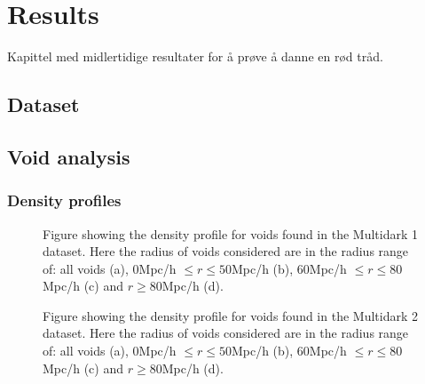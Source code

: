 \chapter{Results}
Kapittel med midlertidige resultater for å prøve å danne en rød tråd.
\section{Dataset}
\section{Void analysis}
\subsection{Density profiles}
\begin{figure}[htbp]\label{fig:histMD1}
    \hspace{1em}%
    \hspace{1em}%
    \caption{Figure showing the density profile for voids found in the Multidark 1 dataset. Here the radius of voids considered are in the radius range of: all voids (a), $0$Mpc/h $\leq r\leq 50$Mpc/h (b), $60$Mpc/h $\leq r\leq 80$Mpc/h (c) and $r\geq 80$Mpc/h (d).}
\end{figure}

\begin{figure}[htbp]\label{fig:histMD1}
    \hspace{1em}%
    \hspace{1em}%
    \caption{Figure showing the density profile for voids found in the Multidark 2 dataset. Here the radius of voids considered are in the radius range of: all voids (a), $0$Mpc/h $\leq r\leq 50$Mpc/h (b), $60$Mpc/h $\leq r\leq 80$Mpc/h (c) and $r\geq 80$Mpc/h (d).}
\end{figure}
